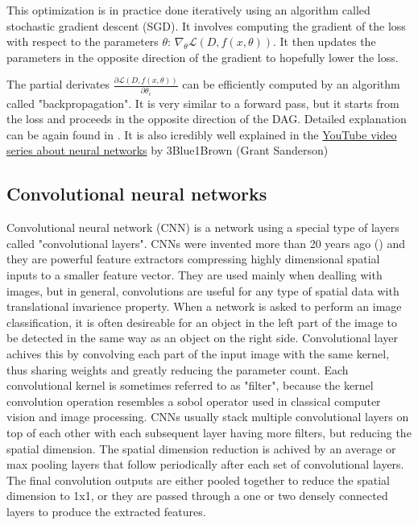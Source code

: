 This optimization is in practice done iteratively using an algorithm called stochastic gradient descent (SGD). It involves computing the gradient of the loss with respect to the parameters $\theta$: $\nabla_{\theta} \mathcal{L}(D, f(x, \theta))$. It then updates the parameters in the opposite direction of the gradient to hopefully lower the loss.

The partial derivates $\frac{\partial \mathcal{L}(D, f(x, \theta))}{\partial \theta_i}$ can be efficiently computed by an algorithm called "backpropagation". It is very similar to a forward pass, but it starts from the loss and proceeds in the opposite direction of the DAG. Detailed explanation can be again found in \cite{Goodfellow-et-al-2016}. It is also icredibly well explained in the \href{https://www.youtube.com/playlist?list=PLZHQObOWTQDNU6R1_67000Dx_ZCJB-3pi}{YouTube video series about neural networks} by 3Blue1Brown (Grant Sanderson)

\subsection{Convolutional neural networks}
Convolutional neural network (CNN) is a network using a special type of layers called "convolutional layers". CNNs were invented more than 20 years ago (\cite{LeCun1998ConvolutionalNF}) and they are powerful feature extractors compressing highly dimensional spatial inputs to a smaller feature vector. They are used mainly when dealling with images, but in general, convolutions are useful for any type of spatial data with translational invarience property. When a network is asked to perform an image classification, it is often desireable for an object in the left part of the image to be detected in the same way as an object on the right side. Convolutional layer achives this by convolving each part of the input image with the same kernel, thus sharing weights and greatly reducing the parameter count. Each convolutional kernel is sometimes referred to as "filter", because the kernel convolution operation resembles a sobol operator used in classical computer vision and image processing. CNNs usually stack multiple convolutional layers on top of each other with each subsequent layer having more filters, but reducing the spatial dimension. The spatial dimension reduction is achived by an average or max pooling layers that follow periodically after each set of convolutional layers. The final convolution outputs are either pooled together to reduce the spatial dimension to 1x1, or they are passed through a one or two densely connected layers to produce the extracted features.


